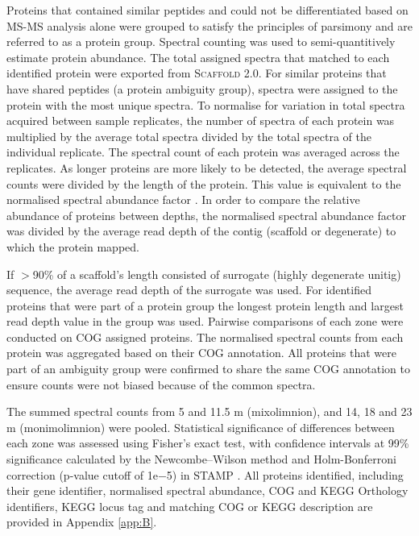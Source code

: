 Proteins that contained similar peptides and could not be differentiated based on \ac{MS-MS} analysis alone were grouped to satisfy the principles of parsimony and are referred to as a protein group. 
Spectral counting was used to semi-quantitively estimate protein abundance. 
The total assigned spectra that matched to each identified protein were exported from \textsc{Scaffold} 2.0. 
For similar proteins that have shared peptides (a protein ambiguity group), spectra were assigned to the protein with the most unique spectra. 
To normalise for variation in total spectra acquired between sample replicates, the number of spectra of each protein was multiplied by the average total spectra divided by the total spectra of the individual replicate. 
The spectral count of each protein was averaged across the replicates. 
As longer proteins are more likely to be detected, the average spectral counts were divided by the length of the protein. 
This value is equivalent to the normalised spectral abundance factor \cite{Florens2006, Zybailov2006}. 
In order to compare the relative abundance of proteins between depths, the normalised spectral abundance factor was divided by the average read depth of the contig (scaffold or degenerate) to which the protein mapped. 

If $>$90\% of a scaffold’s length consisted of surrogate (highly degenerate unitig) sequence, the average read depth of the surrogate was used. 
For identified proteins that were part of a protein group the longest protein length and largest read depth value in the group was used. 
Pairwise comparisons of each zone were conducted on \ac{COG} assigned proteins. 
The normalised spectral counts from each protein was aggregated based on their \ac{COG} annotation. 
All proteins that were part of an ambiguity group were confirmed to share the same \ac{COG} annotation to ensure counts were not biased because of the common spectra.

The summed spectral counts from 5 and 11.5 m (mixolimnion), and 14, 18 and 23 m (monimolimnion) were pooled. 
Statistical significance of differences between each zone was assessed using Fisher's exact test, with confidence intervals at 99\% significance calculated by the Newcombe–Wilson method and Holm-Bonferroni correction (p-value cutoff of 1e$-$5) in \ac{STAMP} \cite{Parks2010}. 
All proteins identified, including their gene identifier, normalised spectral abundance, \ac{COG} and \ac{KEGG} Orthology identifiers, \ac{KEGG} locus tag and matching \ac{COG} or \ac{KEGG} description are provided in Appendix \ref{app:B}.



